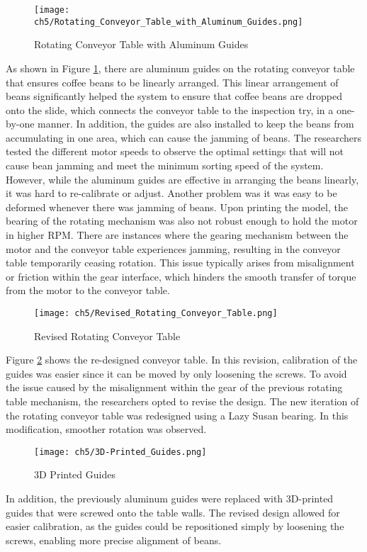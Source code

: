 \begin{figure}[H]
    \centering
    \texttt{[image: ch5/Rotating\_Conveyor\_Table\_with\_Aluminum\_Guides.png]}
    \caption{Rotating Conveyor Table with Aluminum Guides}
    \label{fig:rotating_conveyor_aluminum}
\end{figure}
As shown in Figure \ref{fig:rotating_conveyor_aluminum}, there are aluminum guides on the rotating conveyor table that ensures coffee beans to be linearly arranged. This linear arrangement of beans significantly helped the system to ensure that coffee beans are dropped onto the slide, which connects the conveyor table to the inspection try, in a one-by-one manner. In addition, the guides are also installed to keep the beans from accumulating in one area, which can cause the jamming of beans. The researchers tested the different motor speeds to observe the optimal settings that will not cause bean jamming and meet the minimum sorting speed of the system. However, while the aluminum guides are effective in arranging the beans linearly, it was hard to re-calibrate or adjust. Another problem was it was easy to be deformed whenever there was jamming of beans. Upon printing the model, the bearing of the rotating mechanism was also not robust enough to hold the motor in higher RPM. There are instances where the gearing mechanism between the motor and the conveyor table experiences jamming, resulting in the conveyor table temporarily ceasing rotation. This issue typically arises from misalignment or friction within the gear interface, which hinders the smooth transfer of torque from the motor to the conveyor table.


\begin{figure}[H]
    \centering
    \texttt{[image: ch5/Revised\_Rotating\_Conveyor\_Table.png]}
    \caption{Revised Rotating Conveyor Table}
    \label{fig:revised_rotating_conveyor}
\end{figure}
Figure \ref{fig:revised_rotating_conveyor} shows the re-designed conveyor table. In this revision, calibration of the guides was easier since it can be moved by only loosening the screws. To avoid the issue caused by the misalignment within the gear of the previous rotating table mechanism, the researchers opted to revise the design. The new iteration of the rotating conveyor table was redesigned using a Lazy Susan bearing. In this modification, smoother rotation was observed. 

\begin{figure}[H]
    \centering
    \texttt{[image: ch5/3D-Printed\_Guides.png]}
    \caption{3D Printed Guides}
    \label{fig:3d_printed_guides}
\end{figure}
In addition, the previously aluminum guides were replaced with 3D-printed guides that were screwed onto the table walls. The revised design allowed for easier calibration, as the guides could be repositioned simply by loosening the screws, enabling more precise alignment of beans. 

